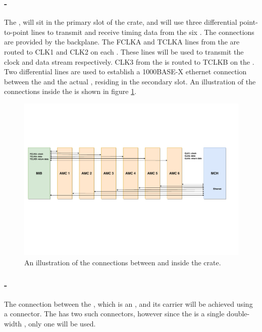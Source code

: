 \documentclass{article}
\begin{document}
\subsubsection{-}
The , will sit in the primary  slot of the \utca crate, and will use three differential point-to-point lines to transmit and receive timing data from the six . The connections are provided by the  backplane. The FCLKA and TCLKA lines from the  are routed to CLK1 and CLK2 on each . These lines will be used to transmit the  clock and data stream respectively. CLK3 from the  is routed to TCLKB on the . Two differential lines are used to establish a 1000BASE-X ethernet connection between the  and the actual , residing in the secondary  slot. An illustration of the connections inside the  is shown in figure \ref{fig:mib_utca_connections}.

\begin{figure}[h]
\includegraphics[width=\textwidth]{mib_utca_connections.pdf}
\caption{An illustration of the connections between  and  inside the  crate.}
\label{fig:mib_utca_connections}
\end{figure}

\subsubsection{-}
The connection between the , which is an , and its  carrier will be achieved using a   connector. The  has two such connectors, however since the  is a single double-width , only one will be used.
\end{document}
